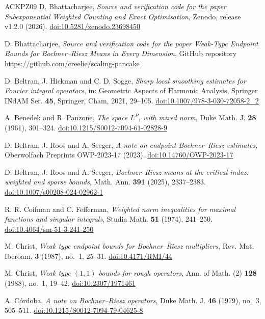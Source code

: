 \begin{thebibliography}{ACKPZ09}
 D. Bhattacharjee, \emph{Source and verification code for the paper Subexponential Weighted Counting and Exact Optimisation}, Zenodo, release v1.2.0 (2026). \href{https://doi.org/10.5281/zenodo.23698450}{doi:10.5281/zenodo.23698450}

 D. Bhattacharjee, \emph{Source and verification code for the paper Weak-Type Endpoint Bounds for Bochner--Riesz Means in Every Dimension}, GitHub repository \url{https://github.com/creelie/scaling-pancake}\archiveline

 D. Beltran, J. Hickman and C. D. Sogge, \emph{Sharp local smoothing estimates for Fourier integral operators}, in: Geometric Aspects of Harmonic Analysis, Springer INdAM Ser. \textbf{45}, Springer, Cham, 2021, 29--105. \href{https://doi.org/10.1007/978-3-030-72058-2_2}{doi:10.1007/978-3-030-72058-2\_2}

 A. Benedek and R. Panzone, \emph{The space $L^P$, with mixed norm}, Duke Math. J. \textbf{28} (1961), 301--324. \href{https://doi.org/10.1215/S0012-7094-61-02828-9}{doi:10.1215/S0012-7094-61-02828-9}

 D. Beltran, J. Roos and A. Seeger, \emph{A note on endpoint Bochner--Riesz estimates}, Oberwolfach Preprints OWP-2023-17 (2023). \href{https://doi.org/10.14760/OWP-2023-17}{doi:10.14760/OWP-2023-17}

 D. Beltran, J. Roos and A. Seeger, \emph{Bochner--Riesz means at the critical index: weighted and sparse bounds}, Math. Ann. \textbf{391} (2025), 2337--2383. \href{https://doi.org/10.1007/s00208-024-02962-1}{doi:10.1007/s00208-024-02962-1}

 R. R. Coifman and C. Fefferman, \emph{Weighted norm inequalities for maximal functions and singular integrals}, Studia Math. \textbf{51} (1974), 241--250. \href{https://doi.org/10.4064/sm-51-3-241-250}{doi:10.4064/sm-51-3-241-250}

 M. Christ, \emph{Weak type endpoint bounds for Bochner--Riesz multipliers}, Rev. Mat. Iberoam. \textbf{3} (1987), no.~1, 25--31. \href{https://doi.org/10.4171/RMI/44}{doi:10.4171/RMI/44}

 M. Christ, \emph{Weak type $(1,1)$ bounds for rough operators}, Ann. of Math. (2) \textbf{128} (1988), no.~1, 19--42. \href{https://doi.org/10.2307/1971461}{doi:10.2307/1971461}

 A. C\'ordoba, \emph{A note on Bochner--Riesz operators}, Duke Math. J. \textbf{46} (1979), no.~3, 505--511. \href{https://doi.org/10.1215/S0012-7094-79-04625-8}{doi:10.1215/S0012-7094-79-04625-8}


\end{thebibliography}
